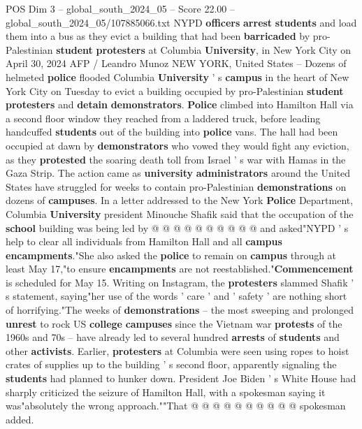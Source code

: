 \begin{textsample}{POS Dim 3 – global\_south\_2024\_05 – Score 22.00 – global\_south\_2024\_05/107885066.txt}  \label{ex:f3_pos_106}
NYPD \textbf{officers} \textbf{arrest} \textbf{students} and load them into a bus as they evict a building that had been \textbf{barricaded} by pro-Palestinian \textbf{student} \textbf{protesters} at Columbia \textbf{University}, in New York City on April 30, 2024 AFP / Leandro Munoz NEW YORK, United States -- Dozens of helmeted \textbf{police} flooded Columbia \textbf{University} ' s \textbf{campus} in the heart of New York City on Tuesday to evict a building occupied by pro-Palestinian \textbf{student} \textbf{protesters} and \textbf{detain} \textbf{demonstrators}. \textbf{Police} climbed into Hamilton Hall via a second floor window they reached from a laddered truck, before leading handcuffed \textbf{students} out of the building into \textbf{police} vans.
The hall had been occupied at dawn by \textbf{demonstrators} who vowed they would fight any eviction, as they \textbf{protested} the soaring death toll from Israel ' s war with Hamas in the Gaza Strip.
The action came as \textbf{university} \textbf{administrators} around the United States have struggled for weeks to contain pro-Palestinian \textbf{demonstrations} on dozens of \textbf{campuses}.
In a letter addressed to the New York \textbf{Police} Department, Columbia \textbf{University} president Minouche Shafik said that the occupation of the \textbf{school} building was being led by @ @ @ @ @ @ @ @ @ @ and asked"NYPD ' s help to clear all individuals from Hamilton Hall and all \textbf{campus} \textbf{encampments}."She also asked the \textbf{police} to remain on \textbf{campus} through at least May 17,"to ensure \textbf{encampments} are not reestablished."\textbf{Commencement} is scheduled for May 15.
Writing on Instagram, the \textbf{protesters} slammed Shafik ' s statement, saying"her use of the words ' care ' and ' safety ' are nothing short of horrifying."The weeks of \textbf{demonstrations} -- the most sweeping and prolonged \textbf{unrest} to rock US \textbf{college} \textbf{campuses} since the Vietnam war \textbf{protests} of the 1960s and 70s -- have already led to several hundred \textbf{arrests} of \textbf{students} and other \textbf{activists}.
Earlier, \textbf{protesters} at Columbia were seen using ropes to hoist crates of supplies up to the building ' s second floor, apparently signaling the \textbf{students} had planned to hunker down.
President Joe Biden ' s White House had sharply criticized the seizure of Hamilton Hall, with a spokesman saying it was"absolutely the wrong approach.""That @ @ @ @ @ @ @ @ @ @ spokesman added.

\end{textsample}
